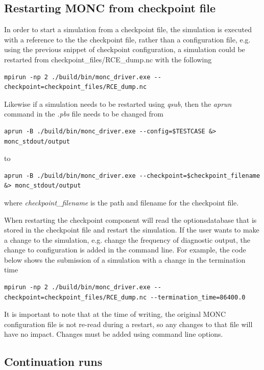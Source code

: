 \documentclass[a4paper,11pt]{article}
\begin{document}
\subsection{Restarting MONC from checkpoint file}

In order to start a simulation from a checkpoint file, the simulation is
executed with a reference to the the checkpoint file, rather than a
configuration file, e.g. using the previous snippet of checkpoint configuration,
a simulation could be restarted from checkpoint\_files/RCE\_dump.nc with
the following

\begin{lstlisting}
mpirun -np 2 ./build/bin/monc_driver.exe --checkpoint=checkpoint_files/RCE_dump.nc
\end{lstlisting}

Likewise if a simulation needs to be restarted using \emph{qsub}, then the
\emph{aprun} command in the \emph{.pbs} file needs to be changed from
\begin{lstlisting}
aprun -B ./build/bin/monc_driver.exe --config=$TESTCASE &> monc_stdout/output
\end{lstlisting}
to
\begin{lstlisting}
aprun -B ./build/bin/monc_driver.exe --checkpoint=$checkpoint_filename  &> monc_stdout/output
\end{lstlisting}
where \emph{checkpoint\_filename} is the path and filename for the checkpoint file.

When restarting the checkpoint component will read the optionsdatabase that is
stored in the checkpoint file and restart the simulation. If the user wants to
make a change to the simulation, e.g. change the frequency of diagnostic output,
the change to configuration is added in the command line. For example, the
code below shows the submission of a simulation with a change in the termination
time
\begin{lstlisting}
mpirun -np 2 ./build/bin/monc_driver.exe --checkpoint=checkpoint_files/RCE_dump.nc --termination_time=86400.0
\end{lstlisting}
It is important to note that at the time of writing, the original MONC
configuration file is not re-read during a restart, so any changes to that file
will have no impact. Changes must be added using command line options.

\subsection{Continuation runs}
\end{document}
